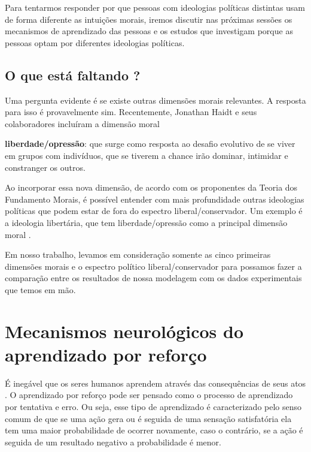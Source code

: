 Para tentarmos responder por que pessoas com ideologias políticas distintas
usam de forma diferente as intuições morais, iremos discutir nas próximas
sessões os mecanismos de aprendizado das pessoas e os estudos que investigam
porque as pessoas optam por diferentes ideologias políticas.

\subsection{O que está faltando ?} %

Uma pergunta evidente é se existe outras dimensões morais relevantes. A
resposta para isso é provavelmente sim. Recentemente, Jonathan Haidt e
seus colaboradores incluíram a dimensão moral   
\begin{description}
    \item \textbf{liberdade/opressão}: que surge como resposta ao desafio
        evolutivo de se viver em grupos com indivíduos, que se tiverem a chance
        irão dominar, intimidar e constranger os outros\citep{Haidt2012}. 
\end{description}

Ao incorporar essa nova dimensão, de acordo com os proponentes da Teoria
dos Fundamento Morais, é possível entender com mais profundidade outras
ideologias políticas que podem estar de fora do espectro liberal/conservador.
Um exemplo é a ideologia libertária, que tem liberdade/opressão como a
principal dimensão moral \cite{Iyer2012,Haidt2012}.

Em nosso trabalho, levamos em consideração somente as cinco primeiras
dimensões morais e o espectro político liberal/conservador para possamos
fazer a comparação entre os resultados de nossa modelagem com os dados
experimentais que temos em mão.

\section{Mecanismos neurológicos do \\aprendizado por reforço} %
\label{sec:ApRe}

É inegável que os seres humanos aprendem através das consequências de
seus atos \citep{Holroyd2002}.  O aprendizado por reforço pode ser pensado
como o processo de aprendizado por tentativa e erro\citep{Shah2012}. Ou seja,
esse tipo de aprendizado é caracterizado  pelo senso comum de que se uma
ação gera ou é seguida de uma sensação satisfatória ela tem uma maior
probabilidade de ocorrer novamente, caso o contrário, se a ação é seguida
de um resultado negativo a probabilidade é menor.

